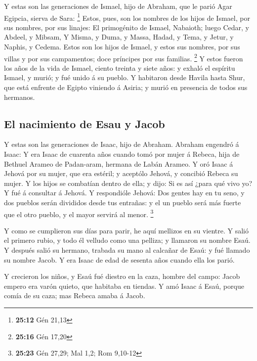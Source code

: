  Y estas son las generaciones de Ismael, hijo de Abraham,
que le parió Agar Egipcia, sierva de Sara: \footnote{\textbf{25:12} Gén
  21,13}  Estos, pues, son los nombres de los hijos de
Ismael, por sus nombres, por sus linajes: El primogénito de Ismael,
Nabaioth; luego Cedar, y Abdeel, y Mibsam,  Y Misma, y
Duma, y Massa,  Hadad, y Tema, y Jetur, y Naphis, y
Cedema.  Estos son los hijos de Ismael, y estos sus
nombres, por sus villas y por sus campamentos; doce príncipes por sus
familias. \footnote{\textbf{25:16} Gén 17,20}  Y estos
fueron los años de la vida de Ismael, ciento treinta y siete años: y
exhaló el espíritu Ismael, y murió; y fué unido á su pueblo.
 Y habitaron desde Havila hasta Shur, que está enfrente
de Egipto viniendo á Asiria; y murió en presencia de todos sus hermanos.

\hypertarget{el-nacimiento-de-esau-y-jacob}{%
\subsection{El nacimiento de Esau y
Jacob}\label{el-nacimiento-de-esau-y-jacob}}

 Y estas son las generaciones de Isaac, hijo de Abraham.
Abraham engendró á Isaac:  Y era Isaac de cuarenta años
cuando tomó por mujer á Rebeca, hija de Bethuel Arameo de Padan-aram,
hermana de Labán Arameo.  Y oró Isaac á Jehová por su
mujer, que era estéril; y aceptólo Jehová, y concibió Rebeca su mujer.
 Y los hijos se combatían dentro de ella; y dijo: Si es
así ¿para qué vivo yo? Y fué á consultar á Jehová.  Y
respondióle Jehová: Dos gentes hay en tu seno, y dos pueblos serán
divididos desde tus entrañas: y el un pueblo será más fuerte que el otro
pueblo, y el mayor servirá al menor. \footnote{\textbf{25:23} Gén 27,29;
  Mal 1,2; Rom 9,10-12}

 Y como se cumplieron sus días para parir, he aquí
mellizos en su vientre.  Y salió el primero rubio, y todo
él velludo como una pelliza; y llamaron su nombre Esaú. 
Y después salió su hermano, trabada su mano al calcañar de Esaú: y fué
llamado su nombre Jacob. Y era Isaac de edad de sesenta años cuando ella
los parió.

 Y crecieron los niños, y Esaú fué diestro en la caza,
hombre del campo: Jacob empero era varón quieto, que habitaba en
tiendas.  Y amó Isaac á Esaú, porque comía de su caza;
mas Rebeca amaba á Jacob.


